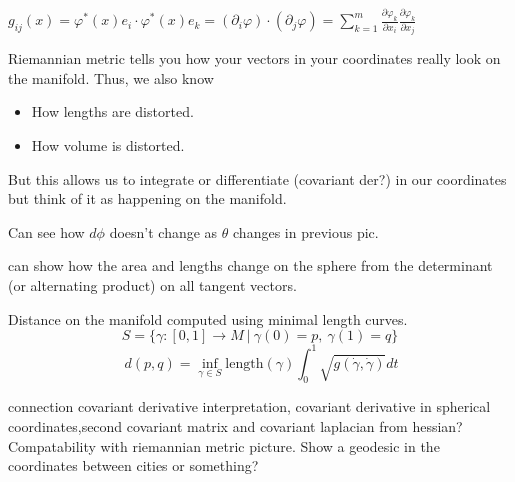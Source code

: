 \documentclass[UKenglish]{beamer}
\begin{document}
\begin{frame}{}
\vfill
$g_{ij}(x) = \varphi^*(x)e_i \cdot \varphi^*(x)e_k = (\partial_i \varphi)\cdot (\partial_j \varphi) = \sum_{k=1}^m \frac{\partial \varphi_k}{\partial x_i}\frac{\partial \varphi_k}{\partial x_j}$
\vfill
\end{frame}

\begin{frame}{}
	Riemannian metric tells you how your vectors in your coordinates really look on the manifold. Thus, we also know
	\begin{itemize}
		\item How lengths are distorted.
		\item How volume is distorted.
	\end{itemize}
	But this allows us to integrate or differentiate (covariant der?) in our coordinates but think of it as happening on the manifold.
\end{frame}

\begin{frame}{}
\vfill
\begin{figure}[H]
	\hspace*{-2cm}
	\def\svgwidth{1.2\columnwidth}
	
\end{figure}
\end{frame}

\begin{frame}{}
	Can see how $d\phi$ doesn't change as $\theta$ changes in previous pic.
\end{frame}

\begin{frame}{}
	can show how the area and lengths change on the sphere from the determinant (or alternating product) on all tangent vectors.
\end{frame}

\begin{frame}{}
	Distance on the manifold computed using minimal length curves.
	\[
	S=\{\gamma \colon [0,1]\to M~\vert~ \gamma(0)=p, ~\gamma(1)=q\}
	\]
	\[
	~d(p,q) = \inf_{\gamma\in S} \mathrm{length}(\gamma)\int_0^1 \sqrt{g(\dot{\gamma},\dot{\gamma})}dt
	\]
\end{frame}

\begin{frame}{}
connection covariant derivative interpretation, covariant derivative in spherical coordinates,second covariant matrix and covariant laplacian from hessian? Compatability with riemannian metric picture. Show a geodesic in the coordinates between cities or something?
\end{frame}
\end{document}
